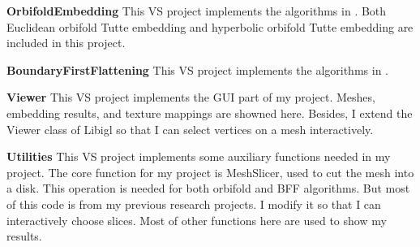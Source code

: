 \textbf{OrbifoldEmbedding} 
This VS project implements the algorithms in \cite{Aigerman:2015:OTE:2816795.2818099}\cite{Aigerman:2016:HOT:2980179.2982412}. Both Euclidean orbifold Tutte embedding and hyperbolic orbifold Tutte embedding are included in this project.

\textbf{BoundaryFirstFlattening}
This VS project implements the algorithms in \cite{1704.06873}.

\textbf{Viewer}
This VS project implements the GUI part of my project. Meshes, embedding results, and texture mappings are showned here.
Besides, I extend the Viewer class of Libigl so that I can select vertices on a mesh interactively.

\textbf{Utilities}
This VS project implements some auxiliary functions needed in my project.
The core function for my project is MeshSlicer, used to cut the mesh into a disk. This operation is needed for both orbifold and BFF algorithms. But most of this code is from my previous research projects. I modify it so that I can interactively choose slices.
Most of other functions here are used to show my results.







